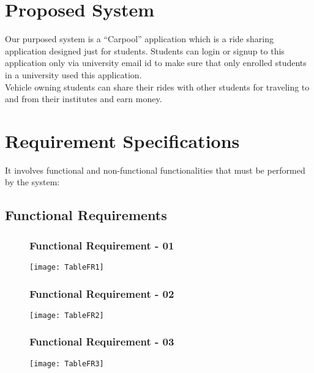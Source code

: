 \section{Proposed System}
Our purposed system is a “Carpool” application which is a ride sharing application designed just for students. Students can login or signup to this application only via university email id to make sure that only enrolled students in a university used this application.\\

Vehicle owning students can share their rides with other students for traveling to and from their institutes and earn money.

\section{Requirement Specifications}
It involves functional and non-functional functionalities that must be performed by the system:

\subsection{Functional Requirements}

\begin{figure}[ht]
\subsubsection{Functional Requirement - 01}
\centering
\texttt{[image: TableFR1]}
\end{figure}

\begin{figure}[ht]
\subsubsection{Functional Requirement - 02}
\centering
\texttt{[image: TableFR2]}
\end{figure}

\begin{figure}[ht]
\subsubsection{Functional Requirement - 03}
\centering
\texttt{[image: TableFR3]}
\end{figure}

